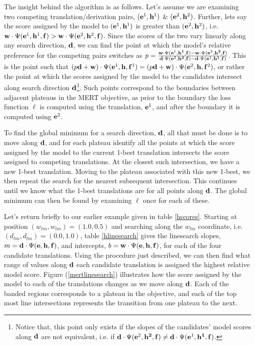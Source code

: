 \documentclass[11pt]{article}
\begin{document}
The insight behind the algorithm is as follows. Let's assume we are examining two competing translation/derivation pairs, $({\bf e}^1, {\bf h}^1)$ \& $({\bf e}^2, {\bf h}^2)$. Further, lets say the score assigned by the model to $({\bf e}^1, {\bf h}^1)$ is greater than  $({\bf e}^2, {\bf h}^2)$, i.e.  ${\bf w} \cdot \Psi({\bf e}^1, {\bf h}^1, {\bf f}) > {\bf w} \cdot \Psi({\bf e}^2, {\bf h}^2, {\bf f})$. Since the scores of the two vary linearly along any search direction, ${\bf d}$, we can find the point at which the model's relative preference for the competing pairs switches as $p = \frac{{\bf w} \cdot \Psi({\bf e}^1, {\bf h^1}, {\bf f}) - {\bf w} \cdot \Psi({\bf e}^2, {\bf h^2}, {\bf f})}{{\bf d} \cdot \Psi({\bf e}^2, {\bf h^2}, {\bf f}) - {\bf d} \cdot \Psi({\bf e}^1, {\bf h^1}, {\bf f})}$. This is the point such that $(p{\bf d} + {\bf w}) \cdot \Psi({\bf e}^1, {\bf h}, {\bf f}^1) = (p{\bf d} + {\bf w}) \cdot \Psi({\bf e}^2, {\bf h}, {\bf f}^2)$, or rather the point at which the scores assigned by the model to the candidates intersect along search direction ${\bf d}$\footnote{Notice that, this point only exists if the slopes of the candidates' model scores along ${\bf d}$ are not equivalent, i.e. if ${\bf d} \cdot \Psi({\bf e}^2, {\bf h^2}, {\bf f}) \neq {\bf d} \cdot \Psi({\bf e}^1, {\bf h^1}, {\bf f})$.}. Such points correspond to the boundaries between adjacent plateaus in the MERT objective, as prior to the boundary the loss function $\ell$ is computed using the translation, ${\bf e}^1$, and after the boundary it is computed using ${\bf e}^2$. 

To find the global minimum for a search direction, ${\bf d}$, all that must be done is to move along ${\bf d}$, and for each plateau identify all the points at which the score assigned by the model to the current 1-best translation intersects the score assigned to competing translations. At the closest such intersection, we have a new 1-best translation. Moving to the plateau associated with this new 1-best, we then repeat the search for the nearest subsequent intersection. This continues until we know what the 1-best translations are for all points along ${\bf d}$. The global minimum can then be found by examining $\ell$ once for each of these.

Let's return briefly to our earlier example given in table \ref{hscores}. Starting at position $(w_{tm}, w_{lm}) = (1.0, 0.5)$ and searching along the $w_{lm}$ coordinate, i.e. $(d_{tm}, d_{lm}) = (0.0, 1.0)$, table \ref{hlinesearch} gives the linesearch slopes, $m = {\bf d} \cdot \Psi({\bf e}, {\bf h}, {\bf f})$, and intercepts, $b = {\bf w} \cdot \Psi({\bf e}, {\bf h}, {\bf f})$, for each of the four candidate translations. Using the procedure just described, we can then find what range of values along ${\bf d}$ each candidate translation is assigned the highest relative model score.  Figure (\ref{mertlinesearch}) illustrates how the score assigned by the model to each of the translations changes as we move along ${\bf d}$. Each of the banded regions corresponds to a plateau in the objective, and each of the top most line intersections represents the transition from one plateau to the next. 
\end{document}
